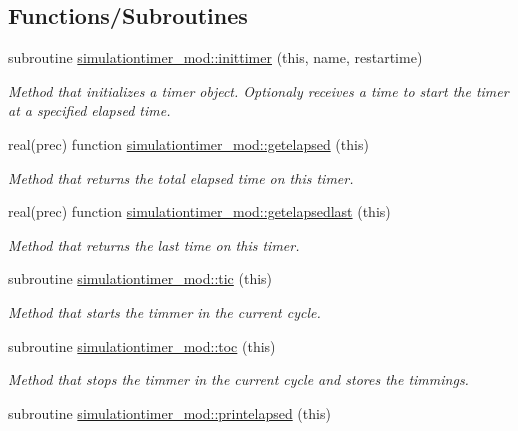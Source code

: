 \subsection*{Functions/\+Subroutines}
\begin{DoxyCompactItemize}
\item 
subroutine \mbox{\hyperlink{namespacesimulationtimer__mod_a3e4c0de31b2db7da6c0c781c047a3743}{simulationtimer\+\_\+mod\+::inittimer}} (this, name, restartime)
\begin{DoxyCompactList}\small\item\em Method that initializes a timer object. Optionaly receives a time to start the timer at a specified elapsed time. \end{DoxyCompactList}\item 
real(prec) function \mbox{\hyperlink{namespacesimulationtimer__mod_a54fa7688c279c747bd76554fb8adb819}{simulationtimer\+\_\+mod\+::getelapsed}} (this)
\begin{DoxyCompactList}\small\item\em Method that returns the total elapsed time on this timer. \end{DoxyCompactList}\item 
real(prec) function \mbox{\hyperlink{namespacesimulationtimer__mod_a70cb936bfcb2754fa6f1fbe3e7a715a5}{simulationtimer\+\_\+mod\+::getelapsedlast}} (this)
\begin{DoxyCompactList}\small\item\em Method that returns the last time on this timer. \end{DoxyCompactList}\item 
subroutine \mbox{\hyperlink{namespacesimulationtimer__mod_a0924f340c4f5785a5981bdc99226e576}{simulationtimer\+\_\+mod\+::tic}} (this)
\begin{DoxyCompactList}\small\item\em Method that starts the timmer in the current cycle. \end{DoxyCompactList}\item 
subroutine \mbox{\hyperlink{namespacesimulationtimer__mod_ae5c4ca42de2cd1f446eee79112cedd14}{simulationtimer\+\_\+mod\+::toc}} (this)
\begin{DoxyCompactList}\small\item\em Method that stops the timmer in the current cycle and stores the timmings. \end{DoxyCompactList}\item 
subroutine \mbox{\hyperlink{namespacesimulationtimer__mod_a9df6f995616d7fa53094178c3aff1fad}{simulationtimer\+\_\+mod\+::printelapsed}} (this)

\end{DoxyCompactItemize}
